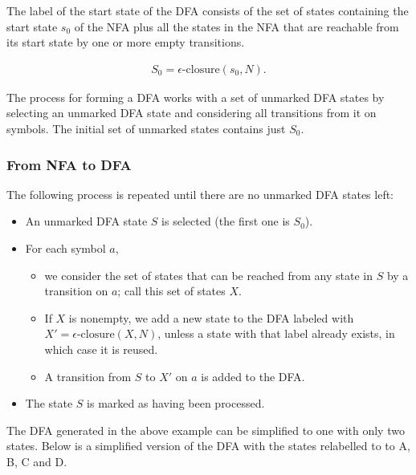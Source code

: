
The label of the start state of the DFA consists of the set of states containing the start state $s_0$ of the NFA plus all the states in the NFA that are reachable from its start state by one or more empty transitions. 

\begin{align*}
    S_0 = \epsilon\text{-closure}(s_0, N). 
\end{align*}

The process for forming a DFA works with a set of unmarked DFA states by selecting an unmarked DFA state and considering all transitions from it on symbols. The initial set of unmarked states contains just $S_0$.

\subsubsection{From NFA to DFA}

The following process is repeated until there are no unmarked DFA states left:
\begin{itemize}
    \item An unmarked DFA state $S$ is selected (the first one is $S_0$).
    \item For each symbol $a$,
    \begin{itemize}
        \item we consider the set of states that can be reached from any state in $S$ by a transition on $a$; call this set of states $X$.
        \item If $X$ is nonempty, we add a new state to the DFA labeled with $X' = \epsilon\text{-closure}(X, N)$, unless a state with that label already exists, in which case it is reused.
        \item A transition from $S$ to $X'$ on $a$ is added to the DFA.
    \end{itemize}
    \item The state $S$ is marked as having been processed.
\end{itemize}






The DFA generated in the above example can be simplified to one with only two states. Below is a simplified version of the DFA with the states relabelled to to A, B, C and D.

